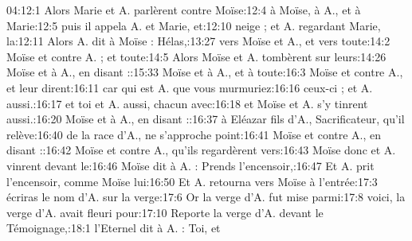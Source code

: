 \begin{multicols}{3}
{04:12:1	Alors Marie et A. parlèrent contre Moïse:12:4	à Moïse, à A., et à Marie:12:5	puis il appela A. et Marie, et:12:10	neige ; et A. regardant Marie, la:12:11	Alors A. dit à Moïse : Hélas,:13:27	vers Moïse et A., et vers toute:14:2	Moïse et contre A. ; et toute:14:5	Alors Moïse et A. tombèrent sur leurs:14:26	Moïse et à A., en disant ::15:33	Moïse et à A., et à toute:16:3	Moïse et contre A., et leur dirent:16:11	car qui est A. que vous murmuriez:16:16	ceux-ci ; et A. aussi.:16:17	et toi et A. aussi, chacun avec:16:18	et Moïse et A. s'y tinrent aussi.:16:20	Moïse et à A., en disant ::16:37	à Eléazar fils d'A., Sacrificateur, qu'il relève:16:40	de la race d'A., ne s'approche point:16:41	Moïse et contre A., en disant ::16:42	Moïse et contre A., qu'ils regardèrent vers:16:43	Moïse donc et A. vinrent devant le:16:46	Moïse dit à A. : Prends l'encensoir,:16:47	Et A. prit l'encensoir, comme Moïse lui:16:50	Et A. retourna vers Moïse à l'entrée:17:3	écriras le nom d'A. sur la verge:17:6	Or la verge d'A. fut mise parmi:17:8	voici, la verge d'A. avait fleuri pour:17:10	Reporte la verge d'A. devant le Témoignage,:18:1	l'Eternel dit à A. : Toi, et\newline
}
\end{multicols}
